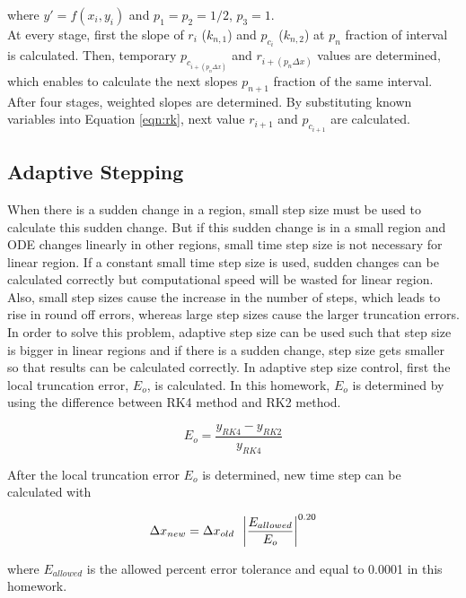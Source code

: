 \documentclass[letterpaper,12pt]{article}
\begin{document}
where $y\prime = f(x_i,y_i)$ and $p_1=p_2=1/2$, $p_3=1$.\\
At every stage, first the slope of $r_i$ ($k_{n,1}$) and  $p_{c_{i}}$ ($k_{n,2}$) at $p_n$ fraction of interval is calculated. 
Then, temporary $p_{c_{i+(p_n\Delta x)}}$ and $r_{i+(p_n\Delta x)}$ values are determined, which enables to calculate the next 
slopes $p_{n+1}$ fraction of the same interval. After four stages, weighted slopes are determined. By substituting known 
variables into Equation \ref{eqn:rk}, next value $r_{i+1}$ and $p_{c_{i+1}}$ are calculated. 
\subsection{Adaptive Stepping}
\label{section:adaptive}

When there is a sudden change in a region, small step size must be used to calculate this sudden change. 
But if this sudden change is in a small region and ODE changes linearly in other regions, small time step size
is not necessary for linear region. If a constant small time step size is used, sudden changes can be calculated correctly but 
computational speed will be wasted for linear region. 
Also, small step sizes cause the increase in the number of steps, which leads to
rise in round off errors, whereas large step sizes cause the larger truncation errors. 
In order to solve this problem, adaptive step size 
can be used such that step size is bigger in linear regions and if there is a sudden change, step size gets
smaller so that results can be calculated correctly. 
In adaptive step size control, first the local truncation error, $E_o$, is calculated. In this 
homework, $E_o$ is determined by using the difference between RK4 method and RK2 method.

\begin{equation}
	E_o = \frac{y_{RK4}-y_{RK2}}{y_{RK4}}
\end{equation}

After the local truncation error $E_o$ is determined, 
new time step can be calculated with 

\begin{equation}
	\Delta x_{new} = \Delta x_{old} \hspace{0.5em} \left| \frac{E_{allowed}}{E_o}\right|^{0.20}
\end{equation}

where $E_{allowed}$ is the allowed percent error tolerance and equal to 0.0001 in this homework.

\newpage
\end{document}
